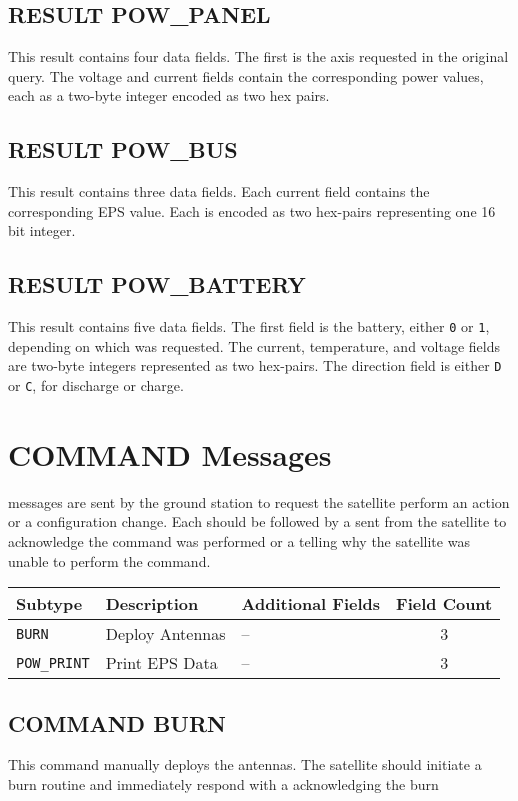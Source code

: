 \documentclass{article}
\begin{document}
    
  \subsection{RESULT POW\_PANEL}
    This result contains four data fields. The first is the axis requested in the original query.
    The voltage and current fields contain the corresponding power values, each as a two-byte integer encoded as two hex 
    pairs.
    
  \subsection{RESULT POW\_BUS}
    This result contains three data fields. Each current field contains the corresponding EPS value. Each is encoded as
    two hex-pairs representing one 16 bit integer.
    
  \subsection{RESULT POW\_BATTERY}
    This result contains five data fields. The first field is the battery, either \texttt{0} or \texttt{1}, depending
    on which was requested. The current, temperature, and voltage fields are two-byte integers represented as two hex-pairs.
    The direction field is either \texttt{D} or \texttt{C}, for discharge or charge.
    
\section{COMMAND Messages}
  \mcommand messages are sent by the ground station to request the satellite perform an action
  or a configuration change. Each \mcommand should be followed by a \macommand sent from the satellite
  to acknowledge the command was performed or a \merror telling why the satellite was unable to perform
  the command.
  
  \begin{center}
  \begin{tabular}{| l | l | l | c |}
    \hline
    Subtype & Description & Additional Fields & Field Count \\ \hline
    \texttt{BURN} & Deploy Antennas & -- & 3\\
    \texttt{POW\_PRINT} & Print EPS Data & -- & 3\\
    \hline
  \end{tabular}
  \end{center}
  
  \subsection{COMMAND BURN}
  This command manually deploys the antennas. The satellite should initiate a burn routine and immediately respond
  with a \macommand acknowledging the burn
  
\end{document}
